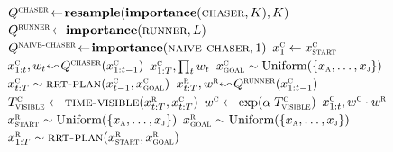 \documentclass[twoside]{article}
\newcommand{\qry}{\ensuremath{$\reflectbox{$\,\leadsto$}$}}
\begin{document}
\begin{algorithm}[!t]
\begin{algorithmic}
\State $Q^\textsc{chaser} \!\gets\! \textbf{resample}(\textbf{importance}(\textsc{chaser}, K), K)$
\State $Q^\textsc{runner} \!\gets\! \textbf{importance}(\textsc{runner}, L)$
\State $Q^\textsc{naive-chaser} \!\gets\! \textbf{importance}(\textsc{naive-chaser}, 1)$
{}
    \State $x^\textsc{c}_1 \gets x^\textsc{c}_\textsc{start}$
    \State $x^\textsc{c}_{1:t}, w_t \qry Q^\textsc{chaser}(x^\textsc{c}_{1:t-1})$    
    \EndFor
    \State \Return $x^\textsc{c}_{1:T}, \prod_t w_t$
\EndQuery
{}
    \State $x^\textsc{c}_\textsc{goal} \sim \text{Uniform}(\{x_\textsc{a},\ldots,x_\textsc{j}\})$
    \State $x^\textsc{c}_{t:T} \sim \Call{rrt-plan}{x^\textsc{c}_{t-1}, x^\textsc{c}_\textsc{goal}}$
    \State $x^\textsc{r}_{t:T}, w^\textsc{r} \qry Q^\textsc{runner}(x^\textsc{c}_{1:t-1})$
    \State $T^\textsc{c}_\textsc{visible} \gets \Call{time-visible}{x^\textsc{r}_{t:T}, x^\textsc{c}_{t:T}}$
    \State $w^\textsc{c} \gets \exp(\alpha \; T^\textsc{c}_\textsc{visible})$
    \State \Return $x^\textsc{c}_{1:t}, w^\textsc{c} \cdot w^\textsc{r}$
\EndQuery
{} 
    \State $x^\textsc{r}_\textsc{start} \sim \text{Uniform}(\{x_\textsc{a},\ldots,x_\textsc{j}\})$
    \State $x^\textsc{r}_\textsc{goal} \sim \text{Uniform}(\{x_\textsc{a},\ldots,x_\textsc{j}\})$
    \State $x^\textsc{r}_{1:T} \sim \Call{rrt-plan}{x^\textsc{r}_\textsc{start}, x^\textsc{r}_\textsc{goal}}$

\end{algorithmic}
\end{algorithm}
\end{document}
